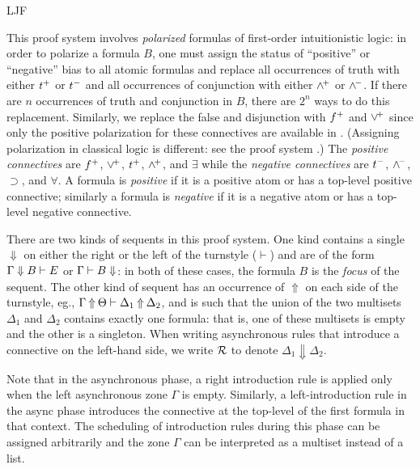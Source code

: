 \begin{entry}{LJF}
\begin{clarifications}
This proof system involves \emph{polarized} formulas of first-order
intuitionistic logic: in order to polarize a formula $B$, one must
assign the status of ``positive'' or ``negative'' bias to all atomic
formulas and replace all occurrences of truth with either $t^+$ or
$t^-$ and all occurrences of conjunction with either $\wedge^{\!+}$ or
$\wedge^{\!-}$.  If there are $n$ occurrences of truth and conjunction in
$B$, there are $2^n$ ways to do this replacement.  Similarly, we
replace the false and disjunction with $f^+$ and $\vee^{\!+}$ since
only the positive polarization for these connectives are available in
\LJF.  (Assigning polarization in classical logic is different: see
the \LKF proof system .) 
The \emph{positive connectives} are $f^+$, $\vee^{\!+}$, $t^+$,
$\wedge^{\!+}$, and $\exists$ while the \emph{negative connectives} are
$t^-$, $\wedge^{\!-}$, $\supset$, and $\forall$.
A formula is \emph{positive} if it is a positive atom or has a top-level
positive connective; similarly a formula is \emph{negative} if it is a
negative atom or has a top-level negative connective.

There are two kinds of sequents in this proof system. 
%
One kind contains a single $\Downarrow$ on either
the right or the left of the turnstyle ($\vdash$) and are of
the form $\Gamma\Downarrow B\vdash E$ or $\Gamma\vdash B\Downarrow$: in both of these
cases, the formula $B$ 
is the \emph{focus} of the sequent.
%
The other kind of sequent has an occurrence of $\Uparrow$ on each side
of the turnstyle, eg., $\Gamma\mathbin\Uparrow\Theta\vdash\Delta_1\mathbin\Uparrow \Delta_2$, 
and is such that the union of the two multisets $\Delta_1$ and
$\Delta_2$ contains exactly one formula: that is, one of these
multisets is empty and the other is a singleton. 
%
When writing asynchronous rules that introduce a connective on the
left-hand side, we write ${\cal R}$ to denote
$\Delta_1\Downarrow\Delta_2$.

Note that in the asynchronous phase, a right introduction rule is
applied only when the left asynchronous zone $\Gamma$ is empty.
Similarly, a left-introduction rule in the async phase introduces the
connective at the top-level of the first formula in that context.  The
scheduling of introduction rules during this phase can be assigned
arbitrarily and the zone $\Gamma$ can be interpreted as a multiset
instead of a list.
\end{clarifications}


\end{entry}
